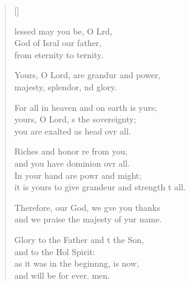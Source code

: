 \settowidth{\versewidth}{it is yours to give grandeur and strength to all.}
\begin{verse}[\versewidth]
  \begin{patverse}
    lessed may you be, O Lrd,\Flex\\
God of Isral our father,\Med\\
from eternity to ternity.

Yours, O Lord, are grandur and power,\Med\\
majesty, splendor, nd glory.

For all in heaven and on earth is yurs;\Flex\\
yours, O Lord, \pointup{\i}s the sovereignty;\Med\\
you are exalted as head ovr all.

Riches and honor re from you,\Med\\
and you have dominion ovr all.\\
In your hand are powr and might;\Med\\
it is yours to give grandeur and strength t all.

Therefore, our God, we g\pointup{\i}ve you thanks\Med\\
and we praise the majesty of yur name.

Glory to the Father and t the Son,\Med\\
    and to the Hol Spirit:\\
as it was in the beginn\pointup{\i}ng, is now,\Med\\
    and will be for ever. men.
  \end{patverse}
\end{verse}
